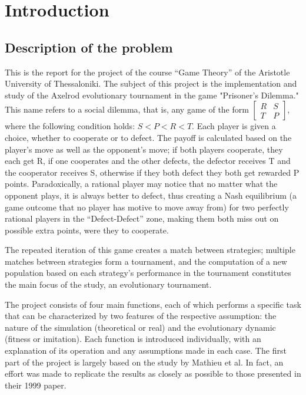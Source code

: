 \section{Introduction}
\subsection{Description of the problem}
This is the report for the project of the course ``Game Theory'' of the Aristotle University of Thessaloniki. The subject of this project is the implementation and study of the Axelrod evolutionary tournament in the game "Prisoner's Dilemma." This name refers to a social dilemma, that is, any game of the form $\begin{bmatrix} R & S \\ T & P \end{bmatrix}$, where the following condition holds: $S < P < R < T$. Each player is given a choice, whether to cooperate or to defect. The payoff is calculated based on the player's move as well as the opponent's move; if both players cooperate, they each get R, if one cooperates and the other defects, the defector receives T and the cooperator receives S, otherwise if they both defect they both get rewarded P points. Paradoxically, a rational player may notice that no matter what the opponent plays, it is always better to defect, thus creating a Nash equilibrium (a game outcome that no player has motive to move away from) for two perfectly rational players in the ``Defect-Defect'' zone, making them both miss out on possible extra points, were they to cooperate. 

The repeated iteration of this game creates a match between strategies; multiple matches between strategies form a tournament, and the computation of a new population based on each strategy’s performance in the tournament constitutes the main focus of the study, an evolutionary tournament.

The project consists of four main functions, each of which performs a specific task that can be characterized by two features of the respective assumption: the nature of the simulation (theoretical or real) and the evolutionary dynamic (fitness or imitation). Each function is introduced individually, with an explanation of its operation and any assumptions made in each case. The first part of the project is largely based on the study by Mathieu et al. In fact, an effort was made to replicate the results as closely as possible to those presented in their 1999 paper.

